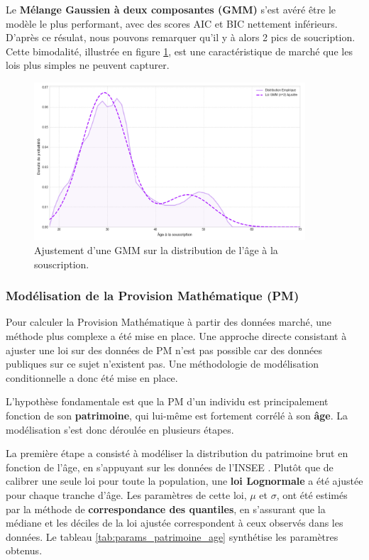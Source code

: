 Le \textbf{Mélange Gaussien à deux composantes (GMM)} s'est avéré être le modèle le plus performant, avec des scores AIC et BIC nettement inférieurs. D'après ce résulat, nous pouvons remarquer qu'il y à alors 2 pics de soucription. Cette bimodalité, illustrée en figure \ref{fig:gmm_souscription}, est une caractéristique de marché que les lois plus simples ne peuvent capturer.

\begin{figure}[H]
\centering
\includegraphics[width=0.9\textwidth]{images/2_chapitres/chapitre3/calibration_loi_GMM_souscription.png}
\caption{Ajustement d'une GMM sur la distribution de l'âge à la souscription.}
\label{fig:gmm_souscription}
\end{figure}


\subsubsection{Modélisation de la Provision Mathématique (PM)}

Pour calculer la Provision Mathématique à partir des données marché, une méthode plus complexe a été mise en place. Une approche directe consistant à ajuster une loi sur des données de PM n'est pas possible car des données publiques sur ce sujet n'existent pas. Une méthodologie de modélisation conditionnelle a donc été mise en place.

L'hypothèse fondamentale est que la PM d'un individu est principalement fonction de son \textbf{patrimoine}, qui lui-même est fortement corrélé à son \textbf{âge}. La modélisation s'est donc déroulée en plusieurs étapes.


La première étape a consisté à modéliser la distribution du patrimoine brut en fonction de l'âge, en s'appuyant sur les données de l'INSEE \cite{insee_patrimoine_age}. Plutôt que de calibrer une seule loi pour toute la population, une \textbf{loi Lognormale} a été ajustée pour chaque tranche d'âge. Les paramètres de cette loi, $\mu$ et $\sigma$, ont été estimés par la méthode de \textbf{correspondance des quantiles}, en s'assurant que la médiane et les déciles de la loi ajustée correspondent à ceux observés dans les données. Le tableau \ref{tab:params_patrimoine_age} synthétise les paramètres obtenus.

